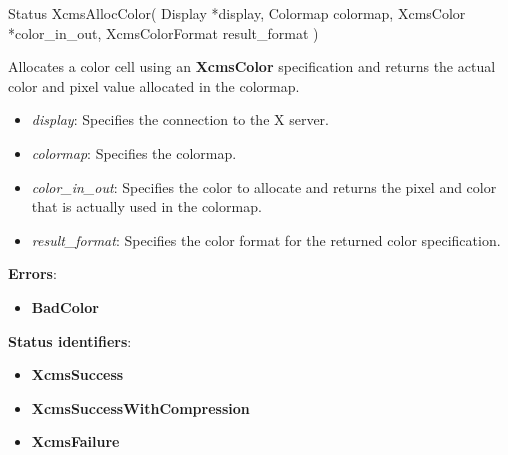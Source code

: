 \documentclass{report}
\begin{document}
\begin{itemize}
            \begin{cppcode}
                Status XcmsAllocColor(
                    Display *display,
                    Colormap colormap,
                    XcmsColor *color_in_out,
                    XcmsColorFormat result_format
                )
            \end{cppcode}
            \bigbreak \noindent
            Allocates a color cell using an \textbf{XcmsColor} specification and returns the actual color and pixel value allocated in the colormap.
            \begin{itemize}
                \item \textit{display}: Specifies the connection to the X server.
                \item \textit{colormap}: Specifies the colormap.
                \item \textit{color\_in\_out}: Specifies the color to allocate and returns the pixel and color that is actually used in the colormap.
                \item \textit{result\_format}: Specifies the color format for the returned color specification.
            \end{itemize}
            \bigbreak \noindent
            \textbf{Errors}:
            \begin{itemize}
                \item \textbf{BadColor}
            \end{itemize}
            \bigbreak \noindent
            \textbf{Status identifiers}:
            \begin{itemize}
                \item \textbf{XcmsSuccess}
                \item \textbf{XcmsSuccessWithCompression}
                \item \textbf{XcmsFailure}
            \end{itemize}


\end{itemize}
\end{document}
